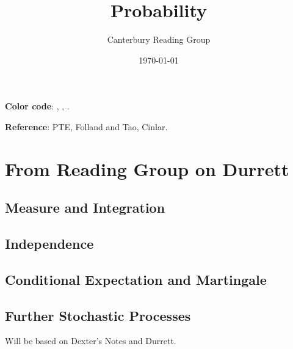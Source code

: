 \documentclass[12pt, oneside]{book}
\begin{document}
    \title{Probability}\author{Canterbury Reading Group}\date{\today}
    \setcounter{tocdepth}{3}
    \tableofcontents
    
    \textbf{Color code}: , , . 

    \textbf{Reference}: PTE, Folland and Tao, Cinlar.
    \chapter{From Reading Group on Durrett}  
        \section{Measure and Integration}
        \section{Independence}
        \section{Conditional Expectation and Martingale}
        \section{Further Stochastic Processes}Will be based on Dexter's Notes and Durrett.

\end{document}
